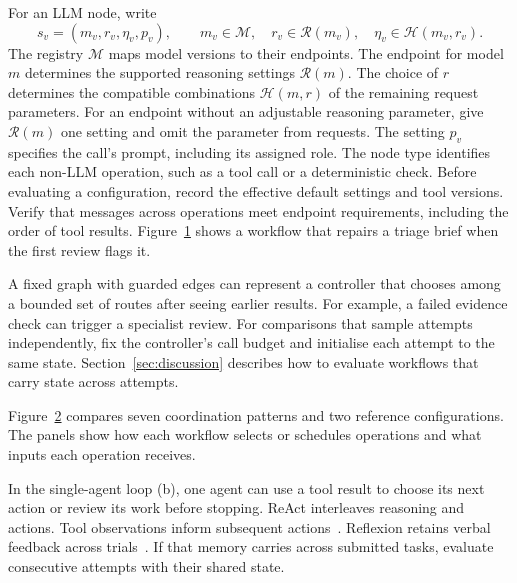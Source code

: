\documentclass[11pt,reqno]{amsart}
\theoremstyle{definition}
\theoremstyle{remark}
\begin{document}
For an LLM node, write
\begin{equation}
 s_v=(m_v,r_v,\eta_v,p_v),
 \qquad
 m_v\in\mathcal M,
 \quad r_v\in\mathcal R(m_v),
 \quad\eta_v\in\mathcal H(m_v,r_v).
 \label{eq:settings}
\end{equation}
The registry $\mathcal M$ maps model versions to their endpoints.
The endpoint for model $m$ determines the supported reasoning settings $\mathcal R(m)$.
The choice of $r$ determines the compatible combinations $\mathcal H(m,r)$ of the remaining request parameters.
For an endpoint without an adjustable reasoning parameter, give $\mathcal R(m)$ one setting and omit the parameter from requests.
The setting $p_v$ specifies the call's prompt, including its assigned role.
The node type identifies each non-LLM operation, such as a tool call or a deterministic check.
Before evaluating a configuration, record the effective default settings and tool versions. Verify that messages across operations meet endpoint requirements, including the order of tool results.
Figure~\ref{fig:graph} shows a workflow that repairs a triage brief when the first review flags it.

A fixed graph with guarded edges can represent a controller that chooses among a bounded set of routes after seeing earlier results.
For example, a failed evidence check can trigger a specialist review.
For comparisons that sample attempts independently, fix the controller's call budget and initialise each attempt to the same state.
Section~\ref{sec:discussion} describes how to evaluate workflows that carry state across attempts.

\begin{figure}[htbp]
\centering


\label{fig:graph}
\end{figure}

Figure~\ref{fig:topologies} compares seven coordination patterns and two reference configurations. The panels show how each workflow selects or schedules operations and what inputs each operation receives.

\begin{figure}[htbp]
\centering


\label{fig:topologies}
\end{figure}

In the single-agent loop (b), one agent can use a tool result to choose its next action or review its work before stopping. ReAct interleaves reasoning and actions. Tool observations inform subsequent actions~\cite{yaoReact2023}. Reflexion retains verbal feedback across trials~\cite{shinnReflexion2023}. If that memory carries across submitted tasks, evaluate consecutive attempts with their shared state.
\end{document}
